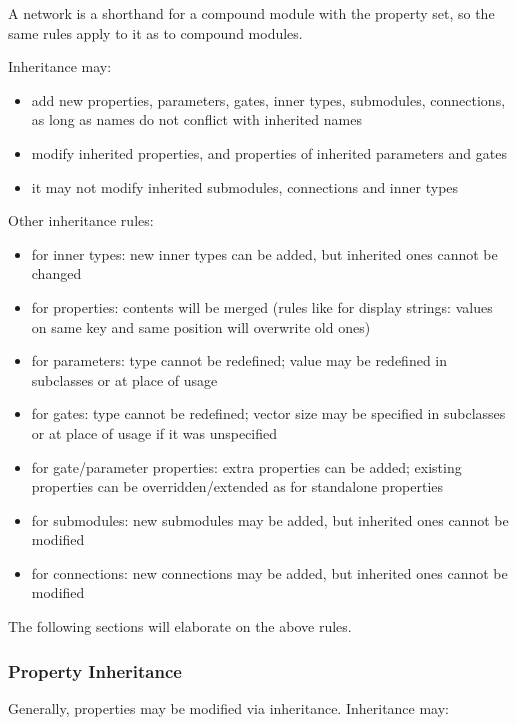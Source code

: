 {A network is a shorthand for a compound module with the 
property set, so the same rules apply to it as to compound modules.

Inheritance may:
\begin{itemize}
    \item add new properties, parameters, gates, inner types, submodules,
          connections, as long as names do not conflict with inherited names
    \item modify inherited properties, and properties of inherited parameters and
          gates
    \item it may not modify inherited submodules, connections and inner types
\end{itemize}

Other inheritance rules:
\begin{itemize}
    \item  for inner types:
       new inner types can be added, but inherited ones cannot be changed
    \item  for properties:
       contents will be merged (rules like for display strings: values on
       same key and same position will overwrite old ones)
    \item for parameters:
       type cannot be redefined;
       value may be redefined in subclasses or at place of usage
    \item  for gates:
       type cannot be redefined;
       vector size may be specified in subclasses or at place of usage if it was unspecified
    \item  for gate/parameter properties:
       extra properties can be added;
       existing properties can be overridden/extended as for standalone properties
    \item  for submodules:
       new submodules may be added, but inherited ones cannot be modified
    \item  for connections:
       new connections may be added, but inherited ones cannot be modified
\end{itemize}

The following sections will elaborate on the above rules.

\subsubsection{Property Inheritance}
\label{sec:ned-ref:property-inheritance}

Generally, properties may be modified via inheritance. Inheritance may:

}
